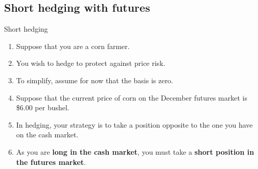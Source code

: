 \documentclass[table,xcolor=pdftex,dvipsnames]{beamer}\usepackage[]{graphicx}\usepackage[]{color}
\begin{document}

\subsection{Short hedging with futures}

\begin{frame}{Short hedging}
\begin{enumerate}[label=\textbullet]
  \item Suppose that you are a corn farmer.
  \item You wish to hedge to protect against price risk.
  \item To simplify, assume for now that the basis is zero.
  \item Suppose that the current price of corn on the December futures market is \$6.00 per bushel.
  \item In hedging, your strategy is to take a position opposite to the one you have on the cash market.
  \item As you are \textbf{long in the cash market}, you must take a \textbf{short position in the futures market}.
\end{enumerate}
\end{frame}
\end{document}

